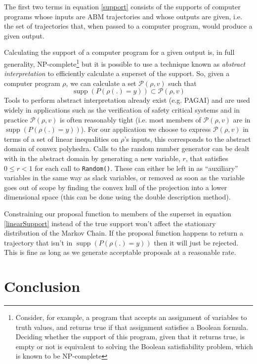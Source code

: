 \documentclass{article}
\DeclareMathOperator\supp{supp}
\begin{document}
The first two terms in equation \eqref{support} consists of the supports of computer programs whose inputs are ABM trajectories and whose outputs are given, i.e. the set of trajectories that, when passed to a computer program, would produce a given output.

Calculating the support of a computer program for a given output is, in full generality, NP-complete\footnote{Consider, for example, a program that accepts an assignment of variables to truth values, and returns true if that assignment satisfies a Boolean formula. Deciding whether the support of this program, given that it returns true, is empty or not is equivalent to solving the Boolean satisfiability problem, which is known to be NP-complete\cite{cook1971complexity}} but it is possible to use a technique known as \textit{abstract interpretation}\cite{cousot1977abstract} to efficiently calculate a superset of the support. So, given a computer program $\rho$, we can calculate a set $\mathcal{P}(\rho, v)$ such that
\[
\supp(P(\rho(.)=y)) \subset \mathcal{P}(\rho, v)
\]
Tools to perform abstract interpretation already exist (e.g. PAGAI\cite{henry2012pagai}) and are used widely in applications such as the verification of safety critical systems\cite{blanchet2003static} and in practice $\mathcal{P}(\rho, v)$ is often reasonably tight (i.e. most members of $\mathcal{P}(\rho, v)$ are in $\supp(P(\rho(.)=y))$). For our application we choose to express $\mathcal{P}(\rho, v)$ in terms of a set of linear inequalities on $\rho$'s inputs, this corresponds to the abstract domain of convex polyhedra\cite{cousot1978automatic}\cite{becchi2018efficient}. Calls to the random number generator can be dealt with in the abstract domain by generating a new variable, $r$, that satisfies $0 \le r < 1$ for each call to \texttt{Random()}. These can either be left in as ``auxiliary'' variables in the same way as slack variables, or removed as soon as the variable goes out of scope by finding the convex hull of the projection into a lower dimensional space (this can be done using the double description method\cite{motzkin1953double}).


Constraining our proposal function to members of the superset in equation \eqref{linearSupport} instead of the true support won't affect the stationary distribution of the Markov Chain. If the proposal function happens to return a trajectory that isn't in $\supp(P(\rho(.)=y))$ then it will just be rejected. This is fine as long as we generate acceptable proposals at a reasonable rate.

\section{Conclusion}

%
% 


\end{document}
